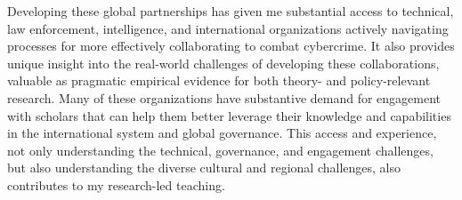 \documentclass[11pt]{letter}
\begin{document}
\begin{letter}
%
Developing these global partnerships has given me substantial access to technical, law enforcement, intelligence, and international organizations actively navigating processes for more effectively collaborating to combat cybercrime.
%
It also provides unique insight into the real-world challenges of developing these collaborations, valuable as pragmatic empirical evidence for both theory- and policy-relevant research.
%
%
%
%
%
Many of these organizations have substantive demand for engagement with scholars that can help them better leverage their knowledge and capabilities in the international system and global governance.
%
This access and experience, not only understanding the technical, governance, and engagement challenges, but also understanding the diverse cultural and regional challenges, also contributes to my research-led teaching.





\end{letter}
\end{document}
